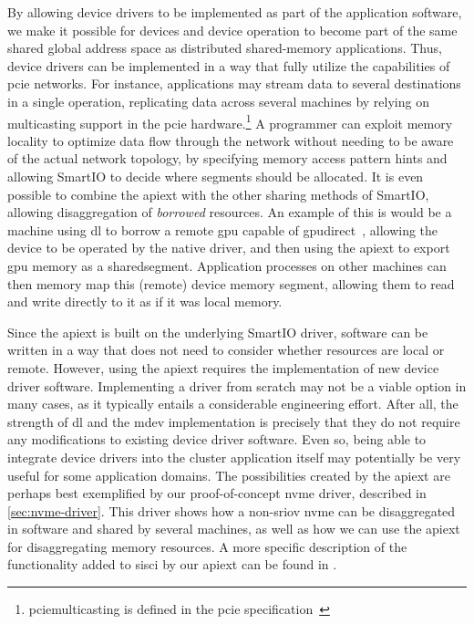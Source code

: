 By allowing device drivers to be implemented as part of the application software, we make it possible for devices and device operation to become part of the same shared global address space as distributed shared-memory applications.
%
Thus, device drivers can be implemented in a way that fully utilize the capabilities of \gls{pcie} networks.
%
For instance, applications may stream data to several destinations in a single operation, replicating data across several machines by relying on \gls{multicasting} support in the \gls{pcie} hardware.\footnote{\gls{pciemulticasting} is defined in the \gls{pcie} specification~\cite{spec:PCIe}}
%
A programmer can exploit memory locality to optimize data flow through the network without needing to be aware of the actual network topology, by specifying memory access pattern hints and allowing SmartIO to decide where \glspl{segment} should be allocated.
%
It is even possible to combine the \gls{apiext} with the other sharing methods of SmartIO, allowing \gls{disaggregation} of \emph{borrowed} resources.
%
An example of this is would be a machine using \gls{dl} to borrow a remote \gls{gpu} capable of \gls{gpudirect}~\cite{url:GPUDirect,url:Rosetti2014}, allowing the device to be operated by the native driver, and then using the \gls{apiext} to export \gls{gpu} memory as a \gls{sharedsegment}.
%
Application processes on other machines can then memory map this (remote) device memory \gls{segment}, allowing them to read and write directly to it as if it was local memory.



Since the \gls{apiext} is built on the underlying SmartIO driver, software can be written in a way that does not need to consider whether resources are local or remote.
%
However, using the \gls{apiext} requires the implementation of new device driver software.
%
Implementing a driver from scratch may not be a viable option in many cases, as it typically entails a considerable engineering effort.
%
After all, the strength of \gls{dl} and the \gls{mdev} implementation is precisely that they do not require any modifications to existing device driver software.
%
Even so, being able to integrate device drivers into the cluster application itself may potentially be very useful for some application domains.
%
The possibilities created by the \gls{apiext} are perhaps best exemplified by our proof-of-concept \gls{nvme} driver, described in \cref{sec:nvme-driver}.
%
This driver shows how a non-\gls{sriov} \gls{nvme} can be \gls{disaggregated} in software and shared by several machines, as well as how we can use the \gls{apiext} for \gls{disaggregating} memory resources.
%
A more specific description of the functionality added to \gls{sisci} by our \gls{apiext} can be found in .



